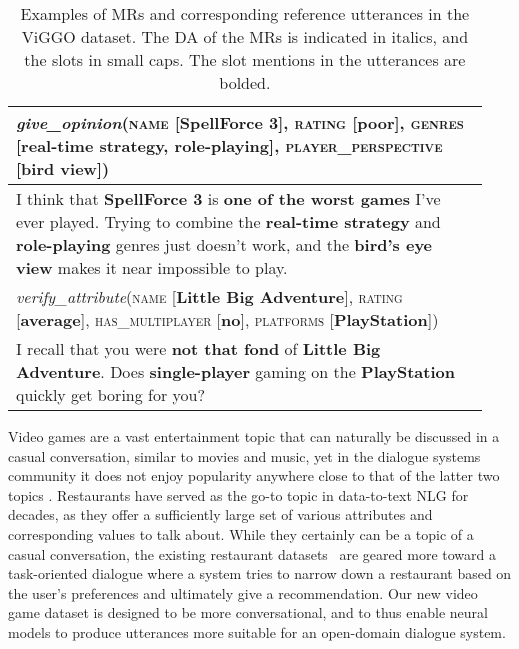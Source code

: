 \documentclass[11pt,a4paper]{article}
\begin{document}
\begin{table}
    \small
   	\centering
   	\def\arraystretch{1.5}
    \begin{tabular}{p{0.94\linewidth}}
\hline
    	\rowcolor{light-gray}
    	\emph{give\_opinion}(\textsc{name} [\textbf{SpellForce 3}], \textsc{rating} [\textbf{poor}], \textsc{genres} [\textbf{real-time strategy, role-playing}], \textsc{play\-er\_per\-spec\-tive} [\textbf{bird view}]) \\
        \hline
    	I think that \textbf{SpellForce 3} is \textbf{one of the worst games} I've ever played. Trying to combine the \textbf{real-time strategy} and \textbf{role-playing} genres just doesn't work, and the \textbf{bird's eye view} makes it near impossible to play. \\
        \hline
    	\rowcolor{light-gray}
    	\emph{verify\_attribute}(\textsc{name} [\textbf{Little Big Adventure}], \textsc{rating} [\textbf{average}], \textsc{has\_multiplayer} [\textbf{no}], \textsc{platforms} [\textbf{PlayStation}]) \\
        \hline
    	I recall that you were \textbf{not that fond} of \textbf{Little Big Adventure}. Does \textbf{single-player} gaming on the \textbf{PlayStation} quickly get boring for you? \\
        \hline
    \end{tabular}
\caption{Examples of MRs and corresponding reference utterances in the ViGGO dataset. The DA of the MRs is indicated in italics, and the slots in small caps. The slot mentions in the utterances are bolded.}
    \label{tab:ex_video_game_dataset}
\end{table}








Video games are a vast entertainment topic that can naturally be discussed in a casual conversation, similar to movies and music, yet in the dialogue systems community it does not enjoy popularity anywhere close to that of the latter two topics \cite{fazel2017learning,li2017end,moghe2018towards,shah2018building,khatri2018advancing}. Restaurants have served as the go-to topic in data-to-text NLG for decades, as they offer a sufficiently large set of various attributes and corresponding values to talk about. While they certainly can be a topic of a casual conversation, the existing restaurant datasets~\cite{stent2004trainable,gavsic2008training,mairesse2010phrase,howcroft2013enhancing,wen2015stochastic,nayak2017plan} are geared more toward a task-oriented dialogue where a system tries to narrow down a restaurant based on the user's preferences and ultimately give a recommendation. Our new video game dataset is designed to be more conversational, and to thus enable neural models to produce utterances more suitable for an open-domain dialogue system.
\end{document}
